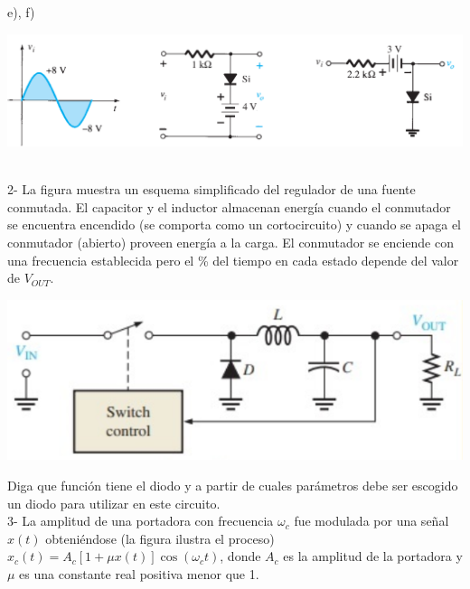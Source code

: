 \documentclass[10pt,letterpaper]{article}
\begin{document}
\begin{minipage}{8cm}
	e), f)
	
	\includegraphics[scale=0.45]{c14.png}
\end{minipage}
\\

2- La figura muestra un esquema simplificado del regulador de una fuente conmutada. El capacitor y el inductor almacenan energía cuando el conmutador se encuentra encendido (se comporta como un cortocircuito) y cuando se apaga el conmutador (abierto) proveen energía a la carga. 
El conmutador se enciende con una frecuencia establecida pero el \% del tiempo en cada estado depende del valor de $V_{OUT}$.

\includegraphics[scale=0.5]{c2.png}

Diga que función tiene el diodo y a partir de cuales parámetros debe ser escogido un diodo para utilizar en este circuito. \\

3- La amplitud de una portadora con frecuencia $\omega_c$ fue modulada por una señal $x(t)$ obteniéndose (la figura ilustra el proceso) $x_c(t)=A_c[1+\mu x(t)]\cos(\omega_ct)$, donde $A_c$ es la amplitud de la portadora y $\mu$ es una constante real positiva menor que 1.
\end{document}

